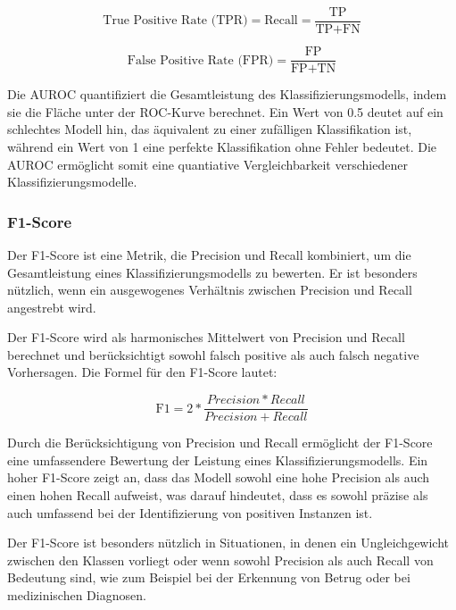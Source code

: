 \begin{equation}
    \text{True Positive Rate (TPR)} = \text{Recall} =\frac{\text{TP}}{\text{TP} + \text{FN}}
\label{TPR}
\end{equation}

\begin{equation}
    \text{False Positive Rate (FPR)} = \frac{\text{FP}}{\text{FP} + \text{TN}} 
\label{FPR}
\end{equation}

Die AUROC quantifiziert die Gesamtleistung des Klassifizierungsmodells, indem sie die Fläche unter der ROC-Kurve berechnet. Ein Wert von 0.5 deutet auf ein schlechtes Modell hin, das äquivalent zu einer zufälligen Klassifikation ist, während ein Wert von 1 eine perfekte Klassifikation ohne Fehler bedeutet. Die AUROC ermöglicht somit eine quantiative Vergleichbarkeit verschiedener Klassifizierungsmodelle.


\subsubsection{F1-Score}
Der F1-Score ist eine Metrik, die Precision und Recall kombiniert, um die Gesamtleistung eines Klassifizierungsmodells zu bewerten. Er ist besonders nützlich, wenn ein ausgewogenes Verhältnis zwischen Precision und Recall angestrebt wird.

Der F1-Score wird als harmonisches Mittelwert von Precision und Recall berechnet und berücksichtigt sowohl falsch positive als auch falsch negative Vorhersagen. Die Formel für den F1-Score lautet:

\begin{equation}
    \text{F1} = 2 * \frac{Precision * Recall}{Precision + Recall}
\label{F1Score}
\end{equation}

Durch die Berücksichtigung von Precision und Recall ermöglicht der F1-Score eine umfassendere Bewertung der Leistung eines Klassifizierungsmodells. Ein hoher F1-Score zeigt an, dass das Modell sowohl eine hohe Precision als auch einen hohen Recall aufweist, was darauf hindeutet, dass es sowohl präzise als auch umfassend bei der Identifizierung von positiven Instanzen ist.

Der F1-Score ist besonders nützlich in Situationen, in denen ein Ungleichgewicht zwischen den Klassen vorliegt oder wenn sowohl Precision als auch Recall von Bedeutung sind, wie zum Beispiel bei der Erkennung von Betrug oder bei medizinischen Diagnosen.


